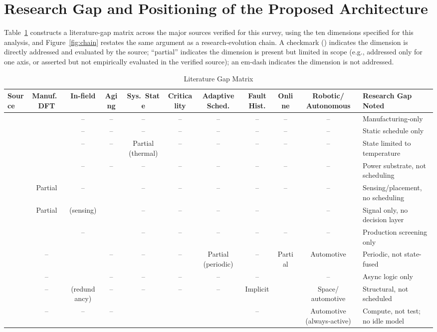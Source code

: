 \documentclass[journal]{IEEEtran}
\newcommand{\ck}{\checkmark}
\begin{document}
\section{Research Gap and Positioning of the Proposed Architecture}
\label{sec:gap}
Table~\ref{tab:gap} constructs a literature-gap matrix across the major sources verified for this survey, using the ten dimensions specified for this analysis, and Figure~\ref{fig:chain} restates the same argument as a research-evolution chain. A checkmark (\ck) indicates the dimension is directly addressed and evaluated by the source; ``partial'' indicates the dimension is present but limited in scope (e.g., addressed only for one axis, or asserted but not empirically evaluated in the verified source); an em-dash indicates the dimension is not addressed.

\begin{table}[t]
\caption{Literature Gap Matrix}
\label{tab:gap}
\centering\scriptsize
\setlength{\tabcolsep}{3pt}
\begin{tabularx}{\textwidth}{@{}lcccccccccX@{}}
\toprule
Source & Manuf.\ DFT & In-field & Aging & Sys.\ State & Criticality & Adaptive Sched. & Fault Hist. & Online & Robotic/ Autonomous & Research Gap Noted\\
\midrule
\cite{r1} & \ck & -- & -- & -- & -- & -- & -- & -- & -- & Manufacturing-only\\
\cite{r2} & \ck & -- & -- & -- & -- & -- & -- & -- & -- & Static schedule only\\
\cite{r3} & \ck & -- & -- & Partial (thermal) & -- & -- & -- & -- & -- & State limited to temperature\\
\cite{r11} & \ck & -- & -- & -- & -- & -- & -- & -- & -- & Power substrate, not scheduling\\
\cite{r4,r5,r13,r14} & Partial & -- & \ck & -- & -- & -- & -- & -- & -- & Sensing/placement, no scheduling\\
\cite{r6,r15} & Partial & \ck (sensing) & \ck & -- & -- & -- & -- & \ck & -- & Signal only, no decision layer\\
\cite{r7} & \ck & -- & \ck & -- & -- & -- & -- & -- & -- & Production screening only\\
\cite{r9} & -- & \ck & -- & -- & -- & Partial (periodic) & -- & Partial & Automotive & Periodic, not state-fused\\
\cite{r16} & -- & \ck & -- & -- & -- & -- & -- & \ck & -- & Async logic only\\
\cite{r8} & -- & \ck (redundancy) & -- & -- & -- & -- & Implicit & \ck & Space/ automotive & Structural, not scheduled\\
\cite{r18} & -- & -- & -- & \ck & \ck & \ck & -- & \ck & Automotive (always-active) & Compute, not test; no idle model\\
\bottomrule
\end{tabularx}
\end{table}
\end{document}
